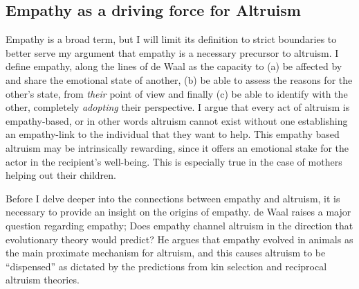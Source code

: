 \documentclass[12pt, letter]{article}
\begin{document}
\subsection*{Empathy as a driving force for Altruism}
Empathy is a broad term, but I will limit its definition to strict boundaries to better serve my argument that empathy is a necessary precursor to altruism. I define empathy, along the lines of de Waal \cite{de2008putting} as the capacity to (a) be affected by and share the emotional state of another, (b) be able to assess the reasons for the other's state, from \emph{their} point of view and finally (c) be able to identify with the other, completely \emph{adopting} their perspective. I argue that every act of altruism is empathy-based, or in other words altruism cannot exist without one establishing an empathy-link to the individual that they want to help. This empathy based altruism may be intrinsically rewarding, since it offers an emotional stake for the actor in the recipient's well-being. This is especially true in the case of mothers helping out their children. 

Before I delve deeper into the connections between empathy and altruism, it is necessary to provide an insight on the origins of empathy. de Waal raises a major question regarding empathy; Does empathy channel altruism in the direction that evolutionary theory would predict? He argues that empathy evolved in animals as the main proximate mechanism for altruism, and this causes altruism to be ``dispensed'' as dictated by the predictions from kin selection and reciprocal altruism theories.
\end{document}
